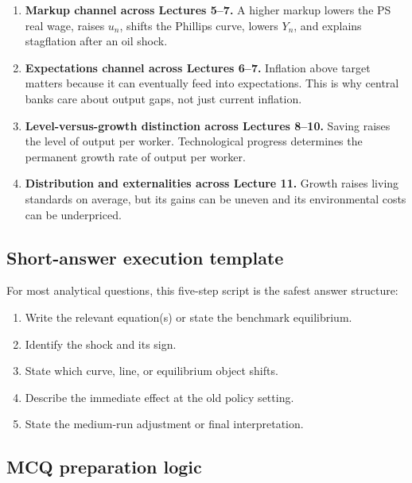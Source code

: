 \documentclass[12pt]{article}
\begin{document}
\begin{enumerate}[leftmargin=1.5em]
\item \textbf{Markup channel across Lectures 5--7.}  
A higher markup lowers the PS real wage, raises \(u_n\), shifts the Phillips curve, lowers \(Y_n\), and explains stagflation after an oil shock.

\item \textbf{Expectations channel across Lectures 6--7.}  
Inflation above target matters because it can eventually feed into expectations. This is why central banks care about output gaps, not just current inflation.

\item \textbf{Level-versus-growth distinction across Lectures 8--10.}  
Saving raises the level of output per worker. Technological progress determines the permanent growth rate of output per worker.

\item \textbf{Distribution and externalities across Lecture 11.}  
Growth raises living standards on average, but its gains can be uneven and its environmental costs can be underpriced.
\end{enumerate}

\subsection{Short-answer execution template}

\begin{examtip}[title={Exam Focus: Standard short-answer script}]
For most analytical questions, this five-step script is the safest answer structure:
\begin{enumerate}[leftmargin=1.5em]
\item Write the relevant equation(s) or state the benchmark equilibrium.
\item Identify the shock and its sign.
\item State which curve, line, or equilibrium object shifts.
\item Describe the immediate effect at the old policy setting.
\item State the medium-run adjustment or final interpretation.
\end{enumerate}
\end{examtip}

\subsection{MCQ preparation logic}
\end{document}
